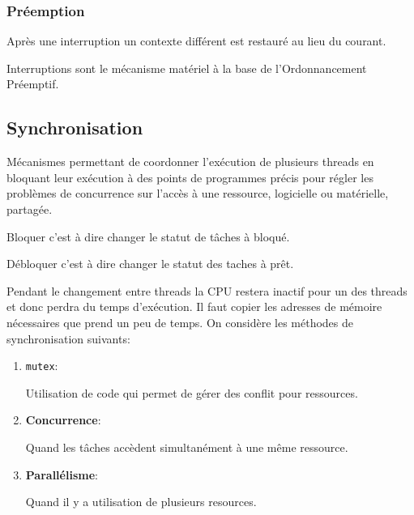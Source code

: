 \documentclass{article}
\begin{document}
\subsubsection{Préemption}
\begin{definition}
    Après une interruption un contexte différent est restauré au lieu du courant.
    \begin{remark}
        Interruptions sont le mécanisme matériel à la base de l'Ordonnancement Préemptif.
    \end{remark}
\end{definition}



\subsection{Synchronisation}
\begin{definition}\label{def:synchronisation}
    Mécanismes permettant de coordonner l'exécution de plusieurs threads en bloquant leur exécution à des points de programmes précis pour régler les problèmes de concurrence sur l'accès à une ressource, logicielle ou matérielle, partagée.

    \begin{remark}
        Bloquer c'est à dire changer le statut de tâches à bloqué.
    \end{remark}
    \begin{remark}
        Débloquer c'est à dire changer le statut des taches à prêt.
    \end{remark}
\end{definition}
Pendant le changement entre threads la CPU restera inactif pour un des threads et donc perdra du temps d'exécution. Il faut copier les adresses de mémoire nécessaires que prend un peu de temps. On considère les méthodes de synchronisation suivants:
\begin{enumerate}[noitemsep, rightmargin=\leftmargin]
    \item \texttt{mutex}:
    \begin{definition}\label{def:mutex}
        Utilisation de code qui permet de gérer des conflit pour ressources. 
    \end{definition}
    
    \item \textbf{Concurrence}:
    \begin{definition}\label{def:concurrence}
        Quand les tâches accèdent simultanément à une même ressource.
    \end{definition}
    
    \item \textbf{Parallélisme}:
    \begin{definition}\label{def:parallelisme}
        Quand il y a utilisation de plusieurs resources.
    \end{definition}
\end{enumerate}
\end{document}
